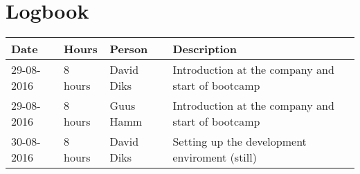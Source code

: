 \chapter{Logbook}
\begin{tabular}{|l|l|l|l|}
	\hline
	\textbf{Date} & \textbf{Hours} & \textbf{Person} & \textbf{Description} \\
	\hline
	29-08-2016 & 8 hours & David Diks & Introduction at the company and start of bootcamp \\ \hline
	29-08-2016 & 8 hours & Guus Hamm & Introduction at the company and start of bootcamp \\ \hline
	30-08-2016 & 8 hours & David Diks & Setting up the development enviroment (still) \\ \hline
\end{tabular}